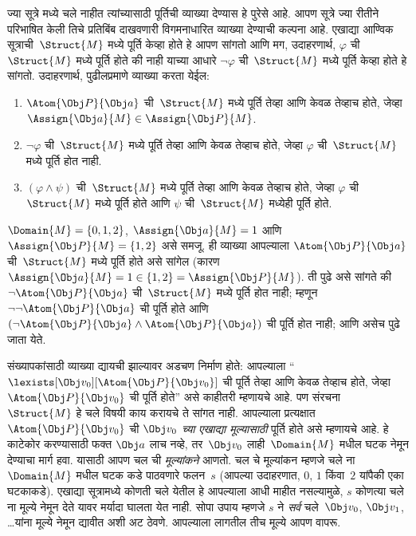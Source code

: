 ज्या सूत्रे मध्ये चले नाहीत त्यांच्यासाठी पूर्तिची
व्याख्या देण्यास हे पुरेसे आहे. आपण सूत्रे ज्या रीतीने परिभाषित
केली तिचे प्रतिबिंब दाखवणारी विगमनाधारित व्याख्या देण्याची कल्पना आहे.
एखाद्या आण्विक सूत्राची~$\Struct{M}$ मध्ये पूर्ति केव्हा होते हे आपण
सांगतो आणि मग, उदाहरणार्थ, $\varphi$ ची~$\Struct{M}$ मध्ये पूर्ति होते की
नाही याच्या आधारे $\lnot \varphi$ ची~$\Struct{M}$ मध्ये पूर्ति केव्हा होते
हे सांगतो. उदाहरणार्थ, पुढीलप्रमाणे व्याख्या करता येईल:
\begin{enumerate}
  \item $\Atom{\Obj P}{\Obj a}$ ची~$\Struct{M}$ मध्ये पूर्ति तेव्हा आणि
  केवळ तेव्हाच होते, जेव्हा $\Assign{\Obj a}{M} \in \Assign{\Obj P}{M}$.
  \item $\lnot \varphi$ ची~$\Struct{M}$ मध्ये पूर्ति तेव्हा आणि केवळ तेव्हाच
  होते, जेव्हा $\varphi$ ची~$\Struct{M}$ मध्ये पूर्ति होत नाही.
  \item $(\varphi \land \psi)$ ची~$\Struct{M}$ मध्ये पूर्ति तेव्हा आणि केवळ
  तेव्हाच होते, जेव्हा $\varphi$ ची~$\Struct{M}$ मध्ये पूर्ति होते आणि
  $\psi$ ची~$\Struct{M}$ मध्येही पूर्ति होते.
\end{enumerate}
$\Domain{M} = \{0, 1, 2\}$, $\Assign{\Obj a}{M} = 1$ आणि
$\Assign{\Obj P}{M} = \{1, 2\}$ असे समजू. ही व्याख्या आपल्याला
$\Atom{\Obj P}{\Obj a}$ ची~$\Struct{M}$ मध्ये पूर्ति होते असे सांगेल
(कारण $\Assign{\Obj a}{M} =  1 \in \{1,2\} = \Assign{\Obj P}{M}$).
ती पुढे असे सांगते की $\lnot \Atom{\Obj P}{\Obj a}$ ची~$\Struct{M}$
मध्ये पूर्ति होत नाही; म्हणून $\lnot\lnot \Atom{\Obj P}{\Obj a}$ ची
पूर्ति होते आणि $(\lnot \Atom{\Obj P}{\Obj a} \land \Atom{\Obj P}{\Obj a})$
ची पूर्ति होत नाही; आणि असेच पुढे जाता येते.

संख्यापकांसाठी व्याख्या द्यायची झाल्यावर अडचण निर्माण होते: आपल्याला
``$\lexists[\Obj v_0][\Atom{\Obj P}{\Obj v_0}]$ ची पूर्ति तेव्हा आणि
केवळ तेव्हाच होते, जेव्हा $\Atom{\Obj P}{\Obj v_0}$ ची पूर्ति होते''
असे काहीतरी म्हणायचे आहे. पण संरचना~$\Struct{M}$ हे
चले विषयी काय करायचे ते सांगत नाही. आपल्याला प्रत्यक्षात
$\Atom{\Obj P}{\Obj v_0}$ ची \emph{$\Obj v_0$ च्या एखाद्या मूल्यासाठी}
पूर्ति होते असे म्हणायचे आहे. हे काटेकोर करण्यासाठी फक्त $\Obj a$ लाच
नव्हे, तर~$\Obj v_0$ लाही~$\Domain{M}$ मधील घटक नेमून देण्याचा
मार्ग हवा. यासाठी आपण चल ची \emph{मूल्यांकने} आणतो.
चल चे मूल्यांकन म्हणजे चले ना~$\Domain{M}$ मधील
घटक कडे पाठवणारे फलन~$s$ (आपल्या उदाहरणात, $0$, $1$ किंवा~$2$
यांपैकी एका घटकाकडे). एखाद्या सूत्रामध्ये कोणती चले
येतील हे आपल्याला आधी माहीत नसल्यामुळे, $s$ कोणत्या चले ना
मूल्ये नेमून देते यावर मर्यादा घालता येत नाही. सोपा उपाय म्हणजे $s$ ने
\emph{सर्व} चले~$\Obj v_0$, $\Obj v_1$, \dots\@ यांना मूल्ये
नेमून द्यावीत अशी अट ठेवणे. आपल्याला लागतील तीच मूल्ये आपण वापरू.


